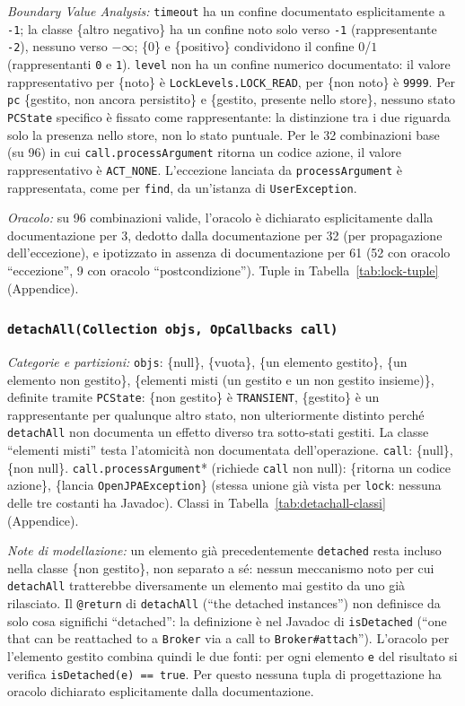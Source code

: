 \textit{Boundary Value Analysis:} \texttt{timeout} ha un confine documentato esplicitamente a
\texttt{-1}; la classe \{altro negativo\} ha un confine noto solo verso \texttt{-1}
(rappresentante \texttt{-2}), nessuno verso $-\infty$; \{0\} e \{positivo\} condividono il
confine $0$/$1$ (rappresentanti \texttt{0} e \texttt{1}). \texttt{level} non ha un confine
numerico documentato: il valore rappresentativo per \{noto\} è \texttt{LockLevels.LOCK\_READ},
per \{non noto\} è \texttt{9999}. Per \texttt{pc} \{gestito, non ancora persistito\} e
\{gestito, presente nello store\}, nessuno stato \texttt{PCState} specifico è fissato come
rappresentante: la distinzione tra i due riguarda solo la presenza nello store, non lo stato
puntuale. Per le 32 combinazioni base (su 96) in cui \texttt{call.processArgument} ritorna un
codice azione, il valore rappresentativo è \texttt{ACT\_NONE}. L'eccezione lanciata da
\texttt{processArgument} è rappresentata, come per \texttt{find}, da un'istanza di
\texttt{UserException}.

\textit{Oracolo:} su 96 combinazioni valide, l'oracolo è dichiarato esplicitamente dalla
documentazione per 3, dedotto dalla documentazione per 32 (per propagazione dell'eccezione), e
ipotizzato in assenza di documentazione per 61 (52 con oracolo ``eccezione'', 9 con oracolo
``postcondizione''). Tuple in Tabella~\ref{tab:lock-tuple} (Appendice).

\subsubsection{\texttt{detachAll(Collection objs, OpCallbacks call)}}

\textit{Categorie e partizioni:} \texttt{objs}: \{null\}, \{vuota\}, \{un elemento gestito\},
\{un elemento non gestito\}, \{elementi misti (un gestito e un non gestito insieme)\}, definite
tramite \texttt{PCState}: \{non gestito\} è \texttt{TRANSIENT}, \{gestito\} è un rappresentante
per qualunque altro stato, non ulteriormente distinto perché \texttt{detachAll} non documenta un
effetto diverso tra sotto-stati gestiti. La classe ``elementi misti'' testa l'atomicità non
documentata dell'operazione. \texttt{call}: \{null\}, \{non null\}.
\texttt{call.processArgument}* (richiede \texttt{call} non null): \{ritorna un codice azione\},
\{lancia \texttt{OpenJPAException}\} (stessa unione già vista per \texttt{lock}: nessuna delle
tre costanti ha Javadoc). Classi in Tabella~\ref{tab:detachall-classi} (Appendice).

\textit{Note di modellazione:} un elemento già precedentemente \texttt{detached} resta incluso
nella classe \{non gestito\}, non separato a sé: nessun meccanismo noto per cui
\texttt{detachAll} tratterebbe diversamente un elemento mai gestito da uno già rilasciato. Il
\texttt{@return} di \texttt{detachAll} (``the detached instances'') non definisce da solo cosa
significhi ``detached'': la definizione è nel Javadoc di \texttt{isDetached} (``one that can be
reattached to a \texttt{Broker} via a call to \texttt{Broker\#attach}''). L'oracolo per l'elemento
gestito combina
quindi le due fonti: per ogni elemento \texttt{e} del risultato si verifica
\texttt{isDetached(e) == true}. Per questo nessuna tupla di progettazione ha oracolo dichiarato
esplicitamente dalla documentazione.

